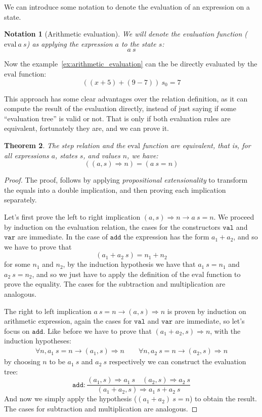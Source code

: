 \documentclass[
  a4paper, 
  10pt, 
  parskip=half, 
  DIV=20,
  toc=bibliography,
  usegeometry,
]{scrartcl}
\newtheorem{theorem}{Theorem}[section]
\newtheorem{notation}[theorem]{Notation}
\newcommand{\funfont}[1]{\text{#1}}
\renewcommand{\implies}{\rightarrow}
\newcommand{\bigstep}{\Longrightarrow}
\begin{document}
We can introduce some notation to denote the evaluation of an expression on a state.

\begin{notation}[Arithmetic evaluation]
  We will denote the evaluation function (\(\funfont{eval} \ a \ s\)) as applying
  the expression \(a\) to the state \(s\):
  \[
  a \ s
  \]
\end{notation}

Now the example~\ref{ex:arithmetic_evaluation} can the be directly 
evaluated by the \(\funfont{eval}\) function:
\[
  ((x + 5) + (9 - 7)) \ s_0 = 7
\]

This approach has some clear advantages over the relation definition, as
it can compute the result of the evaluation directly, instead of 
just saying if some \enquote{evaluation tree} is valid or not. That is only if
both evaluation rules are equivalent, fortunately they are, and we can prove it.

\begin{theorem}
  The step relation and the \(\funfont{eval}\) function are equivalent, that is, for all
  expressions \(a\), states \(s\), and values \(n\), we have:
  \[
  ((a, s) \bigstep n) = (a \ s = n)
  \]
\end{theorem}

\begin{proof}
The proof, follows by applying \emph{propositional extensionality} to
transform the equals into a double implication, and then proving each
implication separately.

Let's first prove the left to right implication 
\((a, s) \bigstep n \implies a \ s = n\). We proceed by induction
on the evaluation relation, the cases for the constructors \(\texttt{val}\)
and \(\texttt{var}\) are immediate. In the case of \(\texttt{add}\) the
expression has the form \(a_1 + a_2\), and so we have to prove that
\[
(a_1 + a_2 \ s) = n_1 + n_2
\]
for some \(n_1\) and \(n_2\), by the induction hypothesis we have that
\(a_1 \ s = n_1\) and \(a_2 \ s = n_2\), and so we just have to apply the
definition of the \(\funfont{eval}\) function to prove the equality.
The cases for the subtraction and multiplication are analogous.

The right to left implication \(a \ s = n \implies (a, s) \bigstep n\)
is proven by induction on arithmetic expression, again the cases for 
\(\texttt{val}\) and \(\texttt{var}\) are immediate, so let's focus on
\(\texttt{add}\). Like before we have to prove that 
\((a_1 + a_2, s) \bigstep n\), with the induction hypotheses:
\[
\begin{gathered}
  \forall n, a_1 \ s = n \implies (a_1, s) \bigstep n \qquad
  \forall n, a_2 \ s = n \implies (a_2, s) \bigstep n
\end{gathered}
\]
by choosing \(n\) to be \(a_1 \ s\) and \(a_2 \ s\) respectively we can construct
the evaluation tree:
\[
  \texttt{add}: \frac{
    (a_1, s) \bigstep a_1 \ s
    \quad
    (a_2, s) \bigstep a_2 \ s
  }
  {
   (a_1 + a_2, s) \bigstep a_1 \ s + a_2 \ s
  }
\]
And now we simply apply the hypothesis (\((a_1 + a_2) \ s = n\)) to obtain the result. The cases for
subtraction and multiplication are analogous.
\end{proof}
\end{document}
